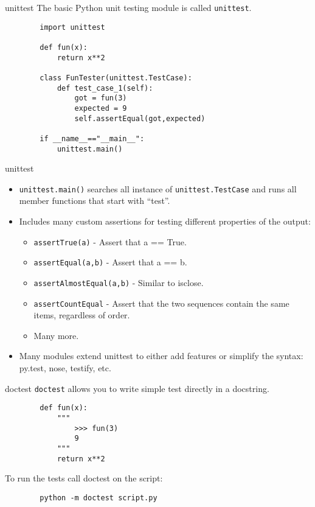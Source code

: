 \documentclass[serif,xcolor=pdftex,dvipsnames,table,hyperref={bookmarks=false,breaklinks}]{beamer}
\begin{document}
\begin{frame}[t]{Strategies for Testing: Unit Testing}
	\centering
	\texttt{[image: \{../Figures/array\_slicing/Slide37]}.png}
\end{frame}

\begin{frame}[t,fragile]{unittest}
	The basic Python unit testing module is called \verb|unittest|.
	\pause
	\begin{lstlisting}
		import unittest
		
		def fun(x):
		    return x**2
			
		class FunTester(unittest.TestCase):
		    def test_case_1(self):
		        got = fun(3)
		        expected = 9
		        self.assertEqual(got,expected)
				
		if __name__=="__main__":
		    unittest.main()
	\end{lstlisting}
\end{frame}

\begin{frame}[t,fragile]{unittest}
	\begin{itemize}[<+->]
		\item \verb|unittest.main()| searches all instance of \verb|unittest.TestCase| and runs all member functions that start with ``test''.
		\item Includes many custom assertions for testing different properties of the output:
		\begin{itemize}[<+->]
			\item \verb|assertTrue(a)| - Assert that a == True.
			\item \verb|assertEqual(a,b)| - Assert that a == b.
			\item \verb|assertAlmostEqual(a,b)| - Similar to isclose.
			\item \verb|assertCountEqual| - Assert that the two sequences contain the same items, regardless of order.
			\item Many more.
		\end{itemize}
		\item Many modules extend unittest to either add features or simplify the syntax: py.test, nose, testify, etc.
	\end{itemize}
\end{frame}

\begin{frame}[t,fragile]{doctest}
	\verb|doctest| allows you to write simple test directly in a docstring.
	\pause
	\begin{lstlisting}		
		def fun(x):
			"""
			    >>> fun(3)
			    9
			"""
		    return x**2
	\end{lstlisting}
	\pause
	To run the tests call doctest on the script:
	\begin{lstlisting}		
		python -m doctest script.py
	\end{lstlisting}
\end{frame}
\end{document}
